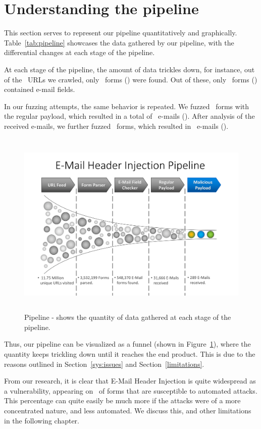 \section[The Pipeline]{Understanding the pipeline}
This section serves to represent our pipeline quantitatively and graphically. Table~\ref{tab:pipeline} showcases the data gathered by our pipeline, with the differential changes at each stage of the pipeline. 

At each stage of the pipeline, the amount of data trickles down, for instance, out of the \urls\ URLs we crawled, only \forms\ forms (\formsDelta) were found. Out of these, only \emailforms\ forms (\emailformsDelta) contained e-mail fields.

In our fuzzing attempts, the same behavior is repeated. We fuzzed \fuzzed\ forms with the regular payload, which resulted in a total of \recd\ e-mails (\recdDelta). After analysis of the received e-mails, we further fuzzed \fuzzed\ forms, which resulted in \success\ e-mails (\successDelta).


\begin{figure}
	\centering
	\includegraphics[width=16cm, height=9cm]{Results/emailheaderpipeline}
	\caption[E-Mail header injection Pipeline]{Pipeline - shows the quantity of data gathered at each stage of the pipeline.}
	\label{fig:pipeline}
\end{figure}

Thus, our pipeline can be visualized as a funnel (shown in Figure~\ref{fig:pipeline}), where the quantity keeps trickling down until it reaches the end product. This is due to the reasons outlined in Section~\ref{sys:issues} and Section~\ref{limitations}.

From our research, it is clear that E-Mail Header Injection is quite widespread as a vulnerability, appearing on \successDelta\ of forms that are susceptible to automated attacks. This percentage can quite easily be much more if the attacks were of a more concentrated nature, and less automated. We discuss this, and other limitations in the following chapter.